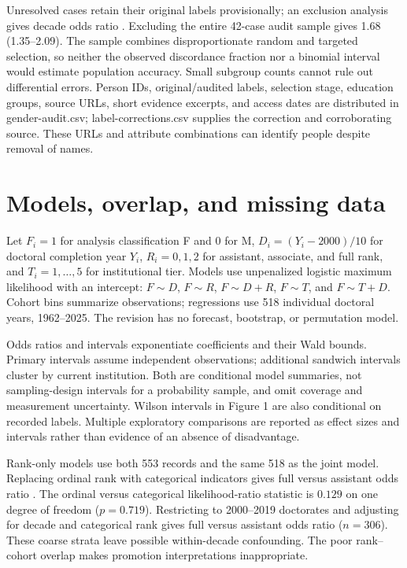 \documentclass[11pt]{article}
\begin{document}
Unresolved cases retain their original labels provisionally; an exclusion analysis gives decade odds ratio \UnresolvedOR. Excluding the entire 42-case audit sample gives 1.68 (1.35--2.09). The sample combines disproportionate random and targeted selection, so neither the observed discordance fraction nor a binomial interval would estimate population accuracy. Small subgroup counts cannot rule out differential errors. Person IDs, original/audited labels, selection stage, education groups, source URLs, short evidence excerpts, and access dates are distributed in gender-audit.csv; label-corrections.csv supplies the correction and corroborating source. These URLs and attribute combinations can identify people despite removal of names.

\section{Models, overlap, and missing data}\label{sec:models}
Let $F_i=1$ for analysis classification F and $0$ for M, $D_i=(Y_i-2000)/10$ for doctoral completion year $Y_i$, $R_i=0,1,2$ for assistant, associate, and full rank, and $T_i=1,\ldots,5$ for institutional tier. Models use unpenalized logistic maximum likelihood with an intercept: $F\sim D$, $F\sim R$, $F\sim D+R$, $F\sim T$, and $F\sim T+D$. Cohort bins summarize observations; regressions use 518 individual doctoral years, 1962--2025. The revision has no forecast, bootstrap, or permutation model.

Odds ratios and intervals exponentiate coefficients and their Wald bounds. Primary intervals assume independent observations; additional sandwich intervals cluster by current institution. Both are conditional model summaries, not sampling-design intervals for a probability sample, and omit coverage and measurement uncertainty. Wilson intervals in Figure 1 are also conditional on recorded labels. Multiple exploratory comparisons are reported as effect sizes and intervals rather than evidence of an absence of disadvantage.

Rank-only models use both 553 records and the same 518 as the joint model. Replacing ordinal rank with categorical indicators gives full versus assistant odds ratio \FullCategoricalOR. The ordinal versus categorical likelihood-ratio statistic is $0.129$ on one degree of freedom ($p=0.719$). Restricting to 2000--2019 doctorates and adjusting for decade and categorical rank gives full versus assistant odds ratio \OverlapOR{} ($n=306$). These coarse strata leave possible within-decade confounding. The poor rank--cohort overlap makes promotion interpretations inappropriate.
\end{document}
